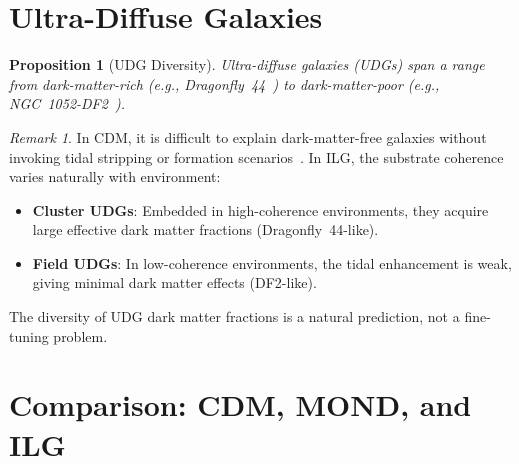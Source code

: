 \documentclass[12pt,a4paper]{article}
\newtheorem{proposition}[theorem]{Proposition}
\theoremstyle{definition}
\theoremstyle{remark}
\newtheorem{remark}[theorem]{Remark}
\begin{document}
\section{Ultra-Diffuse Galaxies}
\label{sec:udg}

\begin{proposition}[UDG Diversity]
\label{prop:udg}
Ultra-diffuse galaxies (UDGs) span a range from
dark-matter-rich (e.g., Dragonfly~44~\cite{vanDokkum2016})
to dark-matter-poor (e.g., NGC~1052-DF2~\cite{vanDokkum2018}).
\end{proposition}

\begin{remark}
In CDM, it is difficult to explain dark-matter-free galaxies
without invoking tidal stripping or formation
scenarios~\cite{Ogiya2018}.  In ILG, the substrate coherence
varies naturally with environment:
\begin{itemize}
  \item \textbf{Cluster UDGs}: Embedded in high-coherence
  environments, they acquire large effective dark matter
  fractions (Dragonfly~44-like).
  \item \textbf{Field UDGs}: In low-coherence environments,
  the tidal enhancement is weak, giving minimal dark matter
  effects (DF2-like).
\end{itemize}
The diversity of UDG dark matter fractions is a natural
prediction, not a fine-tuning problem.
\end{remark}

\section{Comparison: CDM, MOND, and ILG}
\label{sec:comparison}
\end{document}
